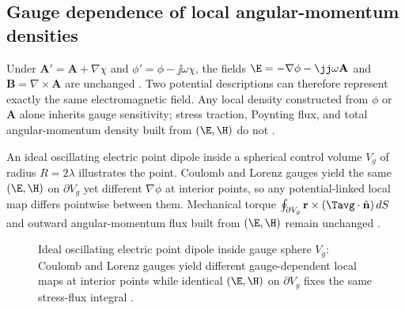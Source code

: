 \subsection{Gauge dependence of local angular-momentum densities}
\label{sec:ch01.6.3}

Under \(\mathbf{A}'=\mathbf{A}+\nabla\chi\) and \(\phi'=\phi-\jj\omega\chi\), the fields \(\E=-\nabla\phi-\jj\omega\mathbf{A}\) and \(\mathbf{B}=\nabla\times\mathbf{A}\) are unchanged \cite{maxwell1873}. Two potential descriptions can therefore represent exactly the same electromagnetic field. Any local density constructed from \(\phi\) or \(\mathbf{A}\) alone inherits gauge sensitivity; stress traction, Poynting flux, and total angular-momentum density built from \((\E,\H)\) do not \cite{belinfante1940,stratton1941}.

An ideal oscillating electric point dipole inside a spherical control volume $V_g$ of radius $R=2\lambda$ illustrates the point. Coulomb and Lorenz gauges yield the same $(\E,\H)$ on $\partial V_g$ yet different $\nabla\phi$ at interior points, so any potential-linked local map differs pointwise between them. Mechanical torque $\oint_{\partial V_g}\mathbf{r}\times(\Tavg\cdot\hat{\mathbf{n}})\,dS$ and outward angular-momentum flux built from $(\E,\H)$ remain unchanged \cite{belinfante1940,stratton1941}.

\begin{figure}[t]
\centering
{}
\caption{Ideal oscillating electric point dipole inside gauge sphere $V_g$: Coulomb and Lorenz gauges yield different gauge-dependent local maps at interior points while identical $(\E,\H)$ on $\partial V_g$ fixes the same stress-flux integral \cite{belinfante1940,stratton1941}.}
\label{fig:ch1.ex63-gauge-volume-sketch}
\end{figure}

